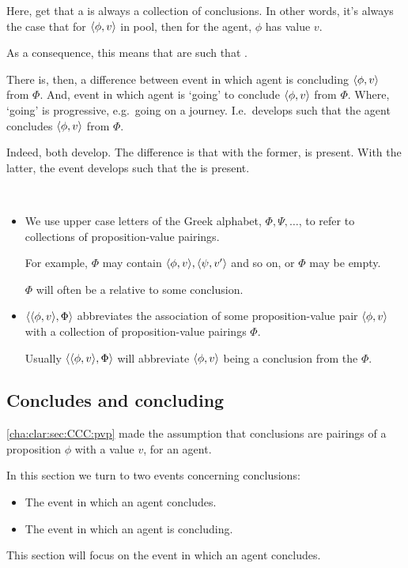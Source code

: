 \begin{note}
  {
    \color{red}
    Here, get that a \poP{} is always a collection of conclusions.
    In other words, it's always the case that for \(\langle \phi, v \rangle\) in pool, then for the agent, \(\phi\) has value \(v\).

    As a consequence, this means that \poP{} are such that \agpe{}.

    There is, then, a difference between event in which agent is concluding \(\langle \phi, v \rangle\) from \(\Phi\).
    And, event in which agent is `going' to conclude \(\langle \phi, v \rangle\) from \(\Phi\).
    Where, `going' is progressive, e.g.\ going on a journey.
    I.e.\ develops such that the agent concludes \(\langle \phi, v \rangle\) from \(\Phi\).

    Indeed, both develop.
    The difference is that with the former, \poP{} is present.
    With the latter, the event develops such that the \poP{} is present.
  }
\end{note}

\begin{note}
  \begin{notation}[\poP{3}]
    \mbox{ }
    \vspace{-\baselineskip}
    \begin{itemize}
    \item
      We use upper case letters of the Greek alphabet, \(\Phi, \Psi, \dots\), to refer to collections of proposition-value pairings.

      For example, \(\Phi\) may contain \(\langle \phi, v \rangle, \langle \psi, v' \rangle\) and so on, or \(\Phi\) may be empty.

      \(\Phi\) will often be a \poP{} relative to some conclusion.
    \item
      \(\langle \langle \phi, v \rangle, \Phi \rangle\) abbreviates the association of some proposition-value pair \(\langle \phi, v \rangle\) with a collection of proposition-value pairings \(\Phi\).

      Usually \(\langle \langle \phi, v \rangle, \Phi \rangle\) will abbreviate \(\langle \phi, v \rangle\) being a conclusion from the \poP{} \(\Phi\).
    \end{itemize}
  \end{notation}
\end{note}

\subsection{Concludes and concluding}
\label{cha:clar:sec:CCC:c-and-c}

\begin{note}
  \autoref{cha:clar:sec:CCC:pvp} made the assumption that conclusions are pairings of a proposition \(\phi\) with a value \(v\), for an agent.

  In this section we turn to two events concerning conclusions:
  \begin{itemize}
  \item
    The event in which an agent concludes.
  \item
    The event in which an agent is concluding.
  \end{itemize}
  This section will focus on the event in which an agent concludes.
\end{note}

